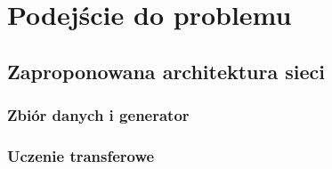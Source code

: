 \chapter{Podejście do problemu}



\section{Zaproponowana architektura sieci}

\subsection{Zbiór danych i generator}

\subsection{Uczenie transferowe}
